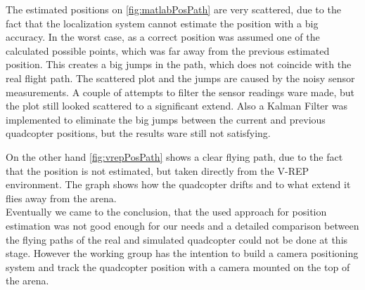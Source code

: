 The estimated positions on \ref{fig:matlabPosPath} are very scattered, due to the fact that the localization system cannot estimate the position with a big accuracy. 
In the worst case, as a correct position was assumed one of the calculated possible points, which was far away from the previous estimated position. 
This creates a big jumps in the path, which does not coincide with the real flight path. 
The scattered plot and the jumps are caused by the noisy sensor measurements. 
A couple of attempts to filter the sensor readings ware made, but the plot still looked scattered to a significant extend. 
Also a Kalman Filter was implemented to eliminate the big jumps between the current and previous quadcopter positions, but the results ware still not satisfying.\\ 

On the other hand \ref{fig:vrepPosPath} shows a clear flying path, due to the fact that the position is not estimated, but taken directly from the V-REP environment. 
The graph shows how the quadcopter drifts and to what extend it flies away from the arena.\\

Eventually we came to the conclusion, that the used approach for position estimation was not good enough for our needs and a detailed comparison between the flying paths of the real and simulated quadcopter could not be done at this stage. 
However the working group has the intention to build a camera positioning system and track the quadcopter position with a camera mounted on the top of the arena.


